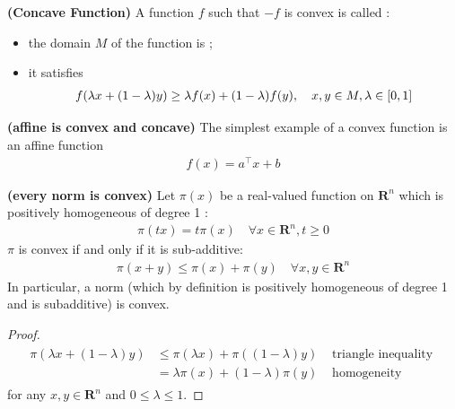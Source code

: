 \documentclass{article}
\newcommand{\bfs}[1]{\textbf{({#1}) }}
\begin{document}
\begin{defa}{\bfs{Concave Function}}
  A function $f$ such that $-f$ is convex is called :
  \begin{itemize}
      \item the domain $M$ of the function is ;
      \item it satisfies \begin{align*}\vspace{-0.4cm}\begin{aligned}
      f(\lambda x+(1-\lambda) y) \geq \lambda f(x)+(1-\lambda) f(y), \quad x, y \in M, \lambda \in[0,1]
      \end{aligned}
\end{align*}
  \end{itemize} 
\end{defa}
\begin{exma}{\bfs{affine is convex and concave}}
   The simplest example of a convex function is an affine function
\begin{align*}
f(x)=a^{\top} x+b
\end{align*}
\end{exma}
\begin{thma}{\bfs{every norm is convex}}
 Let $\pi(x)$ be a real-valued function on $\mathbf{R}^{n}$ which is positively homogeneous of degree 1 :
\begin{align*}
\pi(t x)=t \pi(x) \quad \forall x \in \mathbf{R}^{n}, t \geq 0
\end{align*}
$\pi$ is convex if and only if it is sub-additive:
\begin{align*}
\pi(x+y) \leq \pi(x)+\pi(y) \quad \forall x, y \in \mathbf{R}^{n}
\end{align*}
In particular, a norm (which by definition is positively homogeneous of degree 1 and is subadditive) is convex.
\end{thma}
\begin{proof}\color{ForestGreen}
\begin{align*}
\begin{aligned}
\pi(\lambda x+(1-\lambda) y) & \leq \pi(\lambda x)+\pi((1-\lambda) y) & \text { triangle inequality } \\
&=\lambda \pi(x)+(1-\lambda) \pi(y) & \text { homogeneity }
\end{aligned}
\end{align*}
for any $x, y \in \mathbf{R}^{n}$ and $0 \leq \lambda \leq 1$.
\end{proof}
\end{document}
